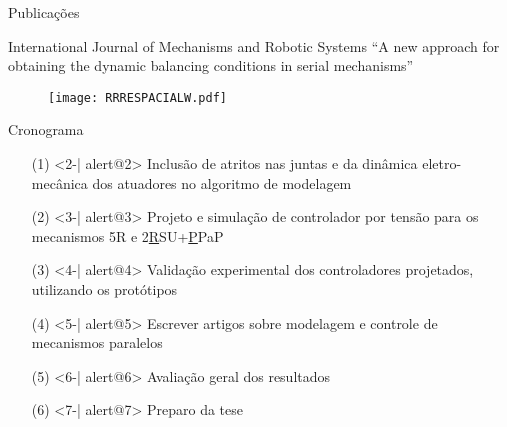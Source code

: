 \documentclass[25pt,landscape]{beamer}
\begin{document}
\begin{frame}{Publica\c{c}\~oes}
    \begin{block}{International Journal of Mechanisms and Robotic Systems}
        ``A new approach for obtaining the dynamic balancing conditions in serial mechanisms''
    \end{block}
    \begin{figure}[!h]
        \centering
        \texttt{[image: RRRESPACIALW.pdf]}
    \end{figure}
\end{frame}


\begin{frame}{Cronograma}
    \begin{itemize}
    	\pause
		\item[(1)]<2-| alert@2> Inclus\~ao de atritos nas juntas e da din\^amica eletro-mec\^anica dos atuadores no algoritmo de modelagem \\[4pt]
		\item[(2)]<3-| alert@3> Projeto e simula\c{c}\~ao de controlador por tens\~ao para os mecanismos 5R e 2\underline{R}SU+\underline{P}PaP \\[4pt]
		\item[(3)]<4-| alert@4> Valida\c{c}\~ao experimental dos controladores projetados, utilizando os prot\'otipos \\[4pt]
		\item[(4)]<5-| alert@5> Escrever artigos sobre modelagem e controle de mecanismos paralelos \\[4pt]
		\item[(5)]<6-| alert@6> Avalia\c{c}\~ao geral dos resultados \\[4pt]
		\item[(6)]<7-| alert@7> Preparo da tese \\[4pt]
    \end{itemize}
\end{frame}
\end{document}
